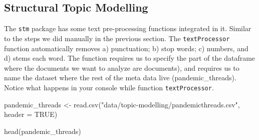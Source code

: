 \documentclass[
  letterpaper,
  DIV=11,
  numbers=noendperiod]{scrreprt}
\newenvironment{Shaded}{\begin{snugshade}}{\end{snugshade}}
\newcommand{\AttributeTok}[1]{\textcolor[rgb]{0.40,0.45,0.13}{#1}}
\newcommand{\ConstantTok}[1]{\textcolor[rgb]{0.56,0.35,0.01}{#1}}
\newcommand{\FunctionTok}[1]{\textcolor[rgb]{0.28,0.35,0.67}{#1}}
\newcommand{\NormalTok}[1]{\textcolor[rgb]{0.00,0.23,0.31}{#1}}
\newcommand{\OtherTok}[1]{\textcolor[rgb]{0.00,0.23,0.31}{#1}}
\newcommand{\StringTok}[1]{\textcolor[rgb]{0.13,0.47,0.30}{#1}}
\begin{document}
\hypertarget{structural-topic-modelling}{%
\subsection{Structural Topic
Modelling}\label{structural-topic-modelling}}

The \texttt{stm} package has some text pre-processing functions
integrated in it. Similar to the steps we did manually in the previous
section. The \texttt{textProcessor} function automatically removes a)
punctuation; b) stop words; c) numbers, and d) stems each word. The
function requires us to specify the part of the dataframe where the
documents we want to analyze are documents), and requires us to name the
dataset where the rest of the meta data live (pandemic\_threads). Notice
what happens in your console while function \texttt{textProcessor}.

\begin{Shaded}
\begin{Highlighting}[]
\NormalTok{pandemic\_threads }\OtherTok{\textless{}{-}} \FunctionTok{read.csv}\NormalTok{(}\StringTok{"data/topic{-}modelling/pandemicthreads.csv"}\NormalTok{, }\AttributeTok{header =} \ConstantTok{TRUE}\NormalTok{)}

\FunctionTok{head}\NormalTok{(pandemic\_threads)}
\end{Highlighting}
\end{Shaded}
\end{document}
